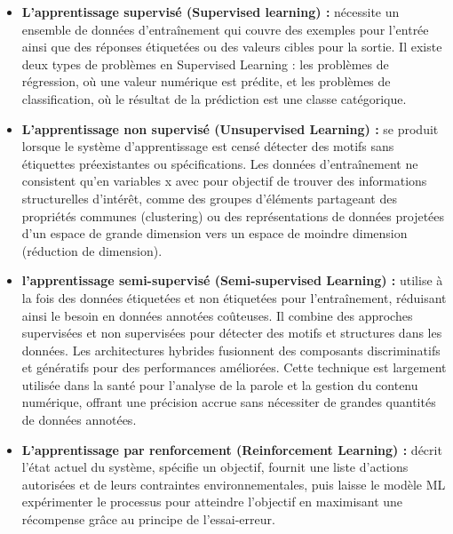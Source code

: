 \documentclass{report}
\begin{document}
 \begin{itemize}
 \item \textbf {L'apprentissage supervisé (Supervised learning) :}  nécessite un ensemble de données d'entraînement qui couvre des exemples pour l'entrée ainsi que des réponses étiquetées ou des valeurs cibles pour la sortie. Il existe deux types de problèmes en Supervised Learning : les problèmes de régression, où une valeur numérique est prédite, et les problèmes de classification, où le résultat de la prédiction est une classe catégorique. \\
 \item \textbf {L'apprentissage non supervisé (Unsupervised Learning) :}  se produit lorsque le système d'apprentissage est censé détecter des motifs sans étiquettes préexistantes ou spécifications. Les données d'entraînement ne consistent qu'en variables x avec pour objectif de trouver des informations structurelles d'intérêt, comme des groupes d'éléments partageant des propriétés communes (clustering) ou des représentations de données projetées d'un espace de grande dimension vers un espace de moindre dimension (réduction de dimension). \\
 \newpage
 \item \textbf {l'apprentissage semi-supervisé (Semi-supervised Learning) :}  utilise à la fois des données étiquetées et non étiquetées pour l'entraînement, réduisant ainsi le besoin en données annotées coûteuses. Il combine des approches supervisées et non supervisées pour détecter des motifs et structures dans les données. Les architectures hybrides fusionnent des composants discriminatifs et génératifs pour des performances améliorées. Cette technique est largement utilisée dans la santé pour l'analyse de la parole et la gestion du contenu numérique, offrant une précision accrue sans nécessiter de grandes quantités de données annotées. \\
 \item \textbf {L'apprentissage par renforcement (Reinforcement Learning) :} décrit l'état actuel du système, spécifie un objectif, fournit une liste d'actions autorisées et de leurs contraintes environnementales, puis laisse le modèle ML expérimenter le processus pour atteindre l'objectif en maximisant une récompense grâce au principe de l'essai-erreur.\cite{Christian Janiesch1 and al,2021}
 \end{itemize}
 
\end{document}
